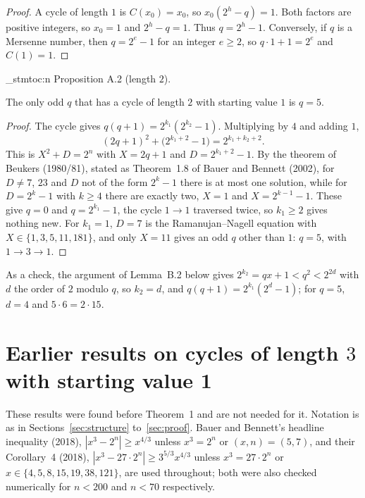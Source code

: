 \documentclass[11pt]{article}
\newenvironment{named}[1]{%
  \par\addvspace{\medskipamount}%
  \pagebreak[3]%
  \noindent{\bfseries #1}\space\ignorespaces
  \stmtoc{#1}%
}{\par\addvspace{\medskipamount}}
\newcommand{\stmtoc}[1]{ \qn_stmtoc:n {#1} }
\begin{document}
\begin{proof}
A cycle of length $1$ is $C(x_0) = x_0$, so $x_0(2^h - q) = 1$.
Both factors are positive integers, so $x_0 = 1$ and $2^h - q = 1$.
Thus $q = 2^h - 1$.
Conversely, if $q$ is a Mersenne number, then $q = 2^e - 1$ for an integer $e \ge 2$, so $q \cdot 1 + 1 = 2^e$ and $C(1) = 1$.
\end{proof}

\label{prop:a2}
\begin{named}{Proposition A.2 (length $2$).}
The only odd $q$ that has a cycle of length $2$ with starting value $1$ is $q = 5$.
\end{named}

\begin{proof}
The cycle gives $q(q+1) = 2^{k_1}(2^{k_2} - 1)$.
Multiplying by $4$ and adding $1$,
\[
(2q+1)^2 + \bigl(2^{k_1+2} - 1\bigr) = 2^{k_1+k_2+2}.
\]
This is $X^2 + D = 2^n$ with $X = 2q+1$ and $D = 2^{k_1+2} - 1$.
By the theorem of Beukers (1980/81), stated as Theorem~1.8 of Bauer and Bennett (2002), for $D \ne 7$, $23$ and $D$ not of the form $2^k - 1$ there is at most one solution, while for $D = 2^k - 1$ with $k \ge 4$ there are exactly two, $X = 1$ and $X = 2^{k-1} - 1$.
These give $q = 0$ and $q = 2^{k_1} - 1$, the cycle $1 \to 1$ traversed twice, so $k_1 \ge 2$ gives nothing new.
For $k_1 = 1$, $D = 7$ is the Ramanujan--Nagell equation with $X \in \{1, 3, 5, 11, 181\}$, and only $X = 11$ gives an odd $q$ other than $1$: $q = 5$, with $1 \to 3 \to 1$.
\end{proof}

As a check, the argument of Lemma~B.2 below gives $2^{k_2} = qx + 1 < q^2 < 2^{2d}$ with $d$ the order of $2$ modulo $q$, so $k_2 = d$, and $q(q+1) = 2^{k_1}(2^d - 1)$; for $q = 5$, $d = 4$ and $5 \cdot 6 = 2 \cdot 15$.

\section{Earlier results on cycles of length $3$ with starting value 1}
\label{sec:earlier}

These results were found before Theorem~1 and are not needed for it.
Notation is as in Sections~\ref{sec:structure} to~\ref{sec:proof}.
Bauer and Bennett's headline inequality (2018), $|x^3 - 2^n| \ge x^{4/3}$ unless $x^3 = 2^n$ or $(x, n) = (5, 7)$, and their Corollary~4 (2018), $|x^3 - 27 \cdot 2^n| \ge 3^{5/3} x^{4/3}$ unless $x^3 = 27 \cdot 2^n$ or $x \in \{4, 5, 8, 15, 19, 38, 121\}$, are used throughout; both were also checked numerically for $n < 200$ and $n < 70$ respectively.
\end{document}

